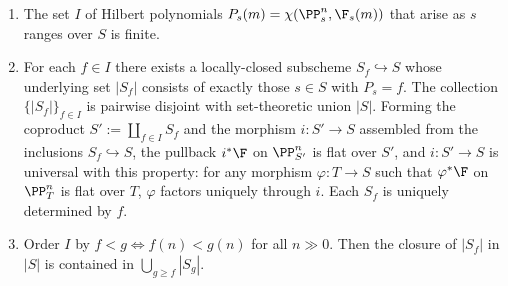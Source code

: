 \begin{theorem}
\begin{enumerate}[label=(\roman*)]
    \item The set \(I\) of Hilbert polynomials
      \(P_s(m) = \chi(\PP^n_s, \F_s(m))\) that arise as \(s\) ranges over \(S\) is
      finite.
    \item For each \(f \in I\) there exists a locally-closed subscheme
      \(S_f \hookrightarrow S\) whose underlying set \(|S_f|\) consists of exactly
      those \(s \in S\) with \(P_s = f\).  The collection \(\{|S_f|\}_{f \in I}\) is
      pairwise disjoint with set-theoretic union \(|S|\).  Forming the coproduct
      \(S' := \coprod_{f \in I} S_f\) and the morphism \(i : S' \to S\) assembled
      from the inclusions \(S_f \hookrightarrow S\), the pullback \(i^* \F\) on
      \(\PP^n_{S'}\) is flat over \(S'\), and \(i : S' \to S\) is universal with this
      property: for any morphism \(\varphi : T \to S\) such that \(\varphi^* \F\) on
      \(\PP^n_T\) is flat over \(T\), \(\varphi\) factors uniquely through \(i\).
      Each \(S_f\) is uniquely determined by \(f\).
    \item Order \(I\) by \(f < g \iff f(n) < g(n)\) for all \(n \gg 0\). Then the
      closure of \(|S_f|\) in \(|S|\) is contained in \(\bigcup_{g \ge f} |S_g|\).
  \end{enumerate}
\end{theorem}

